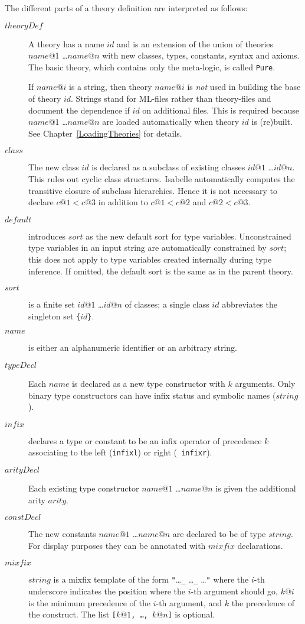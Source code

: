 The different parts of a theory definition are interpreted as follows:
\begin{description} 
\item[$theoryDef$] A theory has a name $id$ and is an
  extension of the union of theories $name@1$ \dots $name@n$ with new
  classes, types, constants, syntax and axioms. The basic theory, which 
  contains only the meta-logic, is called {\tt Pure}.

  If $name@i$ is a string, then theory $name@i$ is {\em not} used in building
  the base of theory $id$. Strings stand for ML-files rather than
  theory-files and document the dependence if $id$ on additional files. This
  is required because $name@1$ \dots $name@n$ are loaded automatically when
  theory $id$ is (re)built. See Chapter~\ref{LoadingTheories} for details.
\item[$class$] The new class $id$ is declared as a subclass of existing
  classes $id@1$ \dots $id@n$.  This rules out cyclic class structures.
  Isabelle automatically computes the transitive closure of subclass
  hierarchies.  Hence it is not necessary to declare $c@1 < c@3$ in addition
  to $c@1 < c@2$ and $c@2 < c@3$.
\item[$default$] introduces $sort$ as the new default sort for type
  variables.  Unconstrained type variables in an input string are
  automatically constrained by $sort$; this does not apply to type variables
  created internally during type inference.  If omitted,
  the default sort is the same as in the parent theory.
\item[$sort$] is a finite set $id@1$ \dots $id@n$ of classes; a single class
  $id$ abbreviates the singleton set {\tt\{}$id${\tt\}}.
\item[$name$] is either an alphanumeric identifier or an arbitrary string.
\item[$typeDecl$] Each $name$ is declared as a new type constructor with
  $k$ arguments.  Only binary type constructors can have infix status and
  symbolic names ($string$).
\item[$infix$] declares a type or constant to be an infix operator of
  precedence $k$ associating to the left ({\tt infixl}) or right ({\tt
    infixr}).
\item[$arityDecl$] Each existing type constructor $name@1$ \dots $name@n$
  is given the additional arity $arity$.
\item[$constDecl$] The new constants $name@1$ \dots $name@n$ are declared to
  be of type $string$.  For display purposes they can be annotated with
  $mixfix$ declarations.
\item[$mixfix$] $string$ is a mixfix template of the form {\tt"}\dots{\tt\_}
  \dots{\tt\_} \dots{\tt"} where the $i$-th underscore indicates the position
  where the $i$-th argument should go, $k@i$ is the minimum precedence of
  the $i$-th argument, and $k$ the precedence of the construct.  The list
  \hbox{\tt[$k@1$, \dots, $k@n$]} is optional.


\end{description}
